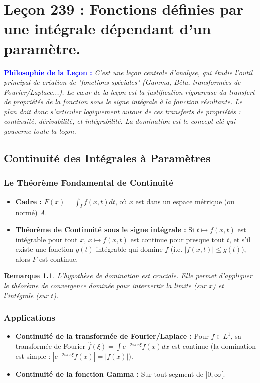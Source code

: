 \documentclass[12pt, a4paper, parskip=full]{report}
\theoremstyle{agregstyle}
\newtheorem{remark}[definition]{Remarque}
\newenvironment{philosophie}
  {\par\medskip\noindent\begin{oframed}\noindent\textbf{\textcolor{blue}{Philosophie de la Leçon :}}\itshape}
  {\end{oframed}\par\medskip}
\begin{document}
\chapter{Leçon 239 : Fonctions définies par une intégrale dépendant d'un paramètre.}

\begin{philosophie}
    C'est une leçon centrale d'analyse, qui étudie l'outil principal de création de "fonctions spéciales" (Gamma, Bêta, transformées de Fourier/Laplace...). Le cœur de la leçon est la justification rigoureuse du transfert de propriétés de la fonction sous le signe intégrale à la fonction résultante. Le plan doit donc s'articuler logiquement autour de ces transferts de propriétés : continuité, dérivabilité, et intégrabilité. La domination est le concept clé qui gouverne toute la leçon.
\end{philosophie}

\section{Continuité des Intégrales à Paramètres}
\subsection{Le Théorème Fondamental de Continuité}
\begin{itemize}
    \item \textbf{Cadre :} $F(x) = \int_I f(x,t)dt$, où $x$ est dans un espace métrique (ou normé) $A$.
    \item \textbf{Théorème de Continuité sous le signe intégrale :} Si $t \mapsto f(x,t)$ est intégrable pour tout $x$, $x \mapsto f(x,t)$ est continue pour presque tout $t$, et s'il existe une fonction $g(t)$ intégrable qui domine $f$ (i.e. $|f(x,t)| \le g(t)$), alors $F$ est continue.
\end{itemize}
\begin{remark}
    L'hypothèse de domination est cruciale. Elle permet d'appliquer le théorème de convergence dominée pour intervertir la limite (sur $x$) et l'intégrale (sur $t$).
\end{remark}
\subsection{Applications}
\begin{itemize}
    \item \textbf{Continuité de la transformée de Fourier/Laplace :} Pour $f \in L^1$, sa transformée de Fourier $\hat{f}(\xi) = \int e^{-2i\pi x \xi} f(x)dx$ est continue (la domination est simple : $|e^{-2i\pi x \xi} f(x)| = |f(x)|$).
    \item \textbf{Continuité de la fonction Gamma :} Sur tout segment de $]0, \infty[$.
\end{itemize}
\end{document}
